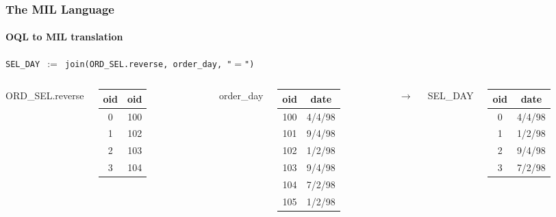 \documentclass{beamer}
\begin{document}
\begin{frame}
  \frametitle{The MIL Language}
  \framesubtitle{OQL to MIL translation}

  \begin{block}{}
  {\tt SEL\_DAY $:=$ join(ORD\_SEL.reverse, order\_day, "$=$")}
  \end{block}

  \begin{columns}

  \column{2cm}

  ORD\_SEL.reverse
  \begin{tabular}{|c|c|}
    \hline
    oid & oid \\
    \hline
    0 & 100 \\
    1 & 102 \\
    2 & 103 \\
    3 & 104 \\
    \hline
  \end{tabular}

  \column{1.5cm}

  order\_day
  \begin{tabular}{|c|c|}
    \hline
    oid & date \\
    \hline
    100 & 4/4/98 \\
    101 & 9/4/98 \\
    102 & 1/2/98 \\
    103 & 9/4/98 \\
    104 & 7/2/98 \\
    105 & 1/2/98 \\
    \hline
  \end{tabular}

  \column{0.5cm}

  $\longrightarrow$

  \column{1cm}

  SEL\_DAY
  \begin{tabular}{|c|c|}
    \hline
    oid & date \\
    \hline
    0 & 4/4/98 \\
    1 & 1/2/98 \\
    2 & 9/4/98 \\
    3 & 7/2/98 \\
    \hline
  \end{tabular}

  \end{columns}

\end{frame}
\end{document}
